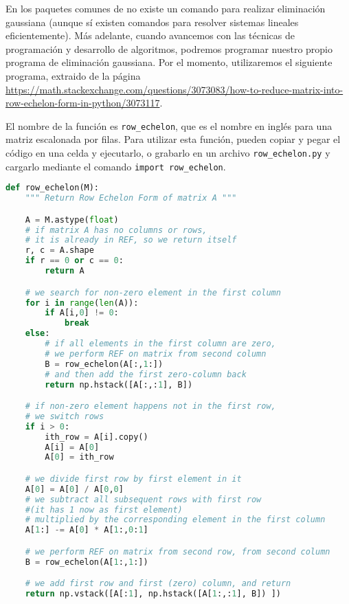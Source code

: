 En los paquetes comunes de \python no existe un comando para realizar eliminación gaussiana (aunque sí existen comandos para resolver sistemas lineales eficientemente). Más adelante, cuando avancemos con las técnicas de programación y desarrollo de algoritmos, podremos programar nuestro propio programa de eliminación gaussiana. Por el momento, utilizaremos el siguiente programa, extraido de la página \url{https://math.stackexchange.com/questions/3073083/how-to-reduce-matrix-into-row-echelon-form-in-python/3073117}.

El nombre de la función es \texttt{row\_echelon}, que es el nombre en inglés para una matriz escalonada por filas. Para utilizar esta función, pueden copiar y pegar el código en una celda y ejecutarlo, o grabarlo en un archivo \texttt{row\_echelon.py} y cargarlo mediante el comando \texttt{import row\_echelon}.

\begin{Shaded}
\begin{lstlisting}[language=Python]
def row_echelon(M):
    """ Return Row Echelon Form of matrix A """

    A = M.astype(float)
    # if matrix A has no columns or rows,
    # it is already in REF, so we return itself
    r, c = A.shape
    if r == 0 or c == 0:
        return A

    # we search for non-zero element in the first column
    for i in range(len(A)):
        if A[i,0] != 0:
            break
    else:
        # if all elements in the first column are zero,
        # we perform REF on matrix from second column
        B = row_echelon(A[:,1:])
        # and then add the first zero-column back
        return np.hstack([A[:,:1], B])

    # if non-zero element happens not in the first row,
    # we switch rows
    if i > 0:
        ith_row = A[i].copy()
        A[i] = A[0]
        A[0] = ith_row

    # we divide first row by first element in it
    A[0] = A[0] / A[0,0]
    # we subtract all subsequent rows with first row
    #(it has 1 now as first element)
    # multiplied by the corresponding element in the first column
    A[1:] -= A[0] * A[1:,0:1]

    # we perform REF on matrix from second row, from second column
    B = row_echelon(A[1:,1:])

    # we add first row and first (zero) column, and return
    return np.vstack([A[:1], np.hstack([A[1:,:1], B]) ])
\end{lstlisting}
\end{Shaded}

